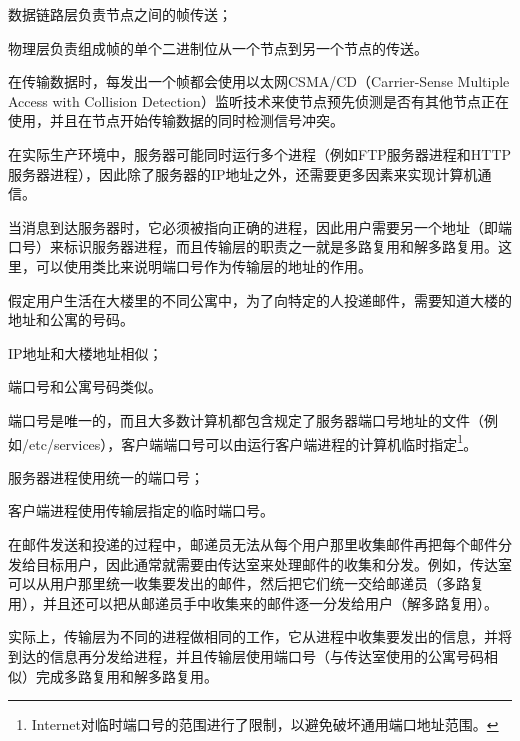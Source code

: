 \begin{compactitem}
\item 数据链路层负责节点之间的帧传送；
\item 物理层负责组成帧的单个二进制位从一个节点到另一个节点的传送。
\end{compactitem}

在传输数据时，每发出一个帧都会使用以太网CSMA/CD（Carrier-Sense Multiple Access with Collision Detection）监听技术来使节点预先侦测是否有其他节点正在使用，并且在节点开始传输数据的同时检测信号冲突。

在实际生产环境中，服务器可能同时运行多个进程（例如FTP服务器进程和HTTP服务器进程），因此除了服务器的IP地址之外，还需要更多因素来实现计算机通信。

当消息到达服务器时，它必须被指向正确的进程，因此用户需要另一个地址（即端口号）来标识服务器进程，而且传输层的职责之一就是多路复用和解多路复用。这里，可以使用类比来说明端口号作为传输层的地址的作用。

假定用户生活在大楼里的不同公寓中，为了向特定的人投递邮件，需要知道大楼的地址和公寓的号码。

\begin{compactitem}
\item IP地址和大楼地址相似；
\item 端口号和公寓号码类似。
\end{compactitem}


端口号是唯一的，而且大多数计算机都包含规定了服务器端口号地址的文件（例如/etc/services），客户端端口号可以由运行客户端进程的计算机临时指定\footnote{Internet对临时端口号的范围进行了限制，以避免破坏通用端口地址范围。}。

\begin{compactitem}
\item 服务器进程使用统一的端口号；
\item 客户端进程使用传输层指定的临时端口号。
\end{compactitem}



在邮件发送和投递的过程中，邮递员无法从每个用户那里收集邮件再把每个邮件分发给目标用户，因此通常就需要由传达室来处理邮件的收集和分发。例如，传达室可以从用户那里统一收集要发出的邮件，然后把它们统一交给邮递员（多路复用），并且还可以把从邮递员手中收集来的邮件逐一分发给用户（解多路复用）。

实际上，传输层为不同的进程做相同的工作，它从进程中收集要发出的信息，并将到达的信息再分发给进程，并且传输层使用端口号（与传达室使用的公寓号码相似）完成多路复用和解多路复用。



